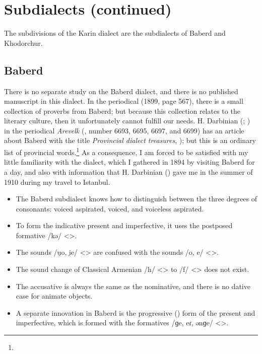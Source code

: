 \section{Subdialects (continued)}

The subdivisions of the Karin dialect are the subdialects of Baberd and Khodorchur. 


\begin{adjarianpage}\label{page:112}\end{adjarianpage}%

\subsection{Baberd}
There is no separate study on the Baberd dialect, and there is no published manuscript in this dialect. In the periodical  (1899, page 567), there is a small collection of proverbs from Baberd; but because this collection relates to the literary culture, then it unfortunately cannot fulfill our needs. H. Darbinian (; ) in the periodical \textit{Arevelk} (, number 6693, 6695, 6697, and 6699) has an article about Baberd with the title \textit{Provincial dialect treasures}, ); but this is an ordinary list of provincial words.\footnote{} As a consequence, I am forced to be satisfied with my little familiarity with the dialect, which I gathered in 1894 by visiting Baberd for a day, and also with information that H. Darbinian () gave me in the summer of 1910 during my travel to Istanbul. 

 

\begin{itemize}
	\item The Baberd subdialect knows how to distinguish between the three degrees of consonants: voiced aspirated, voiced, and voiceless aspirated. 
	\item To form the indicative present and imperfective, it uses the postposed formative /kə/ <>. 
	\item The sounds /u̯o, i̯e/ <> are confused with the sounds /o, e/ <>.
	\item The sound change of Classical Armenian /h/ <> to /f/ <> does not exist.
	\item The accusative is always the same as the nominative, and there is no dative case for animate objects. 
	\item A separate innovation in Baberd is the progressive () form of the present and imperfective, which is formed with the formatives /ɡe, eɾ, ənɡe/ <>. 
\end{itemize}

